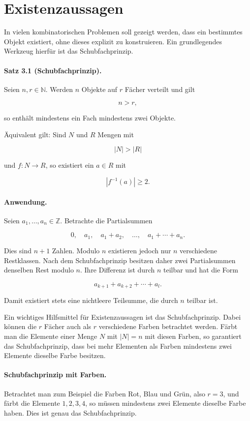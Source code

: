 \documentclass{article}
\begin{document}
\section{Existenzaussagen}

In vielen kombinatorischen Problemen soll gezeigt werden, dass ein
bestimmtes Objekt existiert, ohne dieses explizit zu konstruieren.
Ein grundlegendes Werkzeug hierfür ist das Schubfachprinzip.

\paragraph{Satz 3.1 (Schubfachprinzip).}
Seien \(n,r\in\mathbb N\).
Werden \(n\) Objekte auf \(r\) Fächer verteilt und gilt

\[
n>r,
\]

so enthält mindestens ein Fach mindestens zwei Objekte.

Äquivalent gilt:
Sind \(N\) und \(R\) Mengen mit

\[
|N|>|R|
\]

und \(f:N\to R\), so existiert ein \(a\in R\) mit

\[
|f^{-1}(a)|\ge 2.
\]

\paragraph{Anwendung.}
Seien \(a_1,\dots,a_n\in\mathbb Z\).
Betrachte die Partialsummen

\[
0,\quad
a_1,\quad
a_1+a_2,\quad
\dots,\quad
a_1+\cdots+a_n.
\]

Dies sind \(n+1\) Zahlen.
Modulo \(n\) existieren jedoch nur \(n\) verschiedene Restklassen.
Nach dem Schubfachprinzip besitzen daher zwei Partialsummen denselben
Rest modulo \(n\).
Ihre Differenz ist durch \(n\) teilbar und hat die Form

\[
a_{k+1}+a_{k+2}+\cdots+a_l.
\]

Damit existiert stets eine nichtleere Teilsumme, die durch \(n\)
teilbar ist.

Ein wichtiges Hilfsmittel für Existenzaussagen ist das Schubfachprinzip.
Dabei können die \(r\) Fächer auch als \(r\) verschiedene Farben betrachtet
werden. Färbt man die Elemente einer Menge \(N\) mit \(|N|=n\) mit diesen
Farben, so garantiert das Schubfachprinzip, dass bei mehr Elementen als Farben
mindestens zwei Elemente dieselbe Farbe besitzen.

\paragraph{Schubfachprinzip mit Farben.}
Betrachtet man zum Beispiel die Farben Rot, Blau und Grün, also \(r=3\),
und färbt die Elemente \(1,2,3,4\), so müssen mindestens zwei Elemente
dieselbe Farbe haben. Dies ist genau das Schubfachprinzip.
\end{document}
